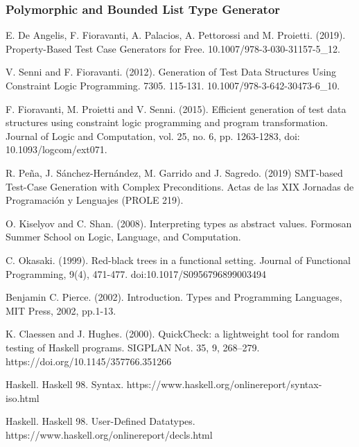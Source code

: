 \documentclass{report}
\theoremstyle{definition}
\theoremstyle{definition}
\begin{document}
	\subsubsection*{Polymorphic and Bounded List Type Generator}
	
	\begin{thebibliography}{9}
		E. De Angelis, F. Fioravanti, A. Palacios, A. Pettorossi and M. Proietti. (2019). Property-Based Test Case Generators for Free. 10.1007/978-3-030-31157-5\_12. 
														
		V. Senni and F. Fioravanti. (2012). Generation of Test Data Structures Using Constraint Logic Programming. 7305. 115-131. 10.1007/978-3-642-30473-6\_10.
														
		F. Fioravanti, M. Proietti and V. Senni. (2015). Efficient generation of test data structures using constraint logic programming and program transformation. Journal of Logic and Computation, vol. 25, no. 6, pp. 1263-1283, doi: 10.1093/logcom/ext071.
														
		R. Peña, J. Sánchez-Hernández, M. Garrido and J. Sagredo. (2019) SMT-based Test-Case Generation with Complex Preconditions. Actas de las XIX Jornadas de Programación y Lenguajes (PROLE 219).
														
		O. Kiselyov and C. Shan. (2008). Interpreting types as abstract values. Formosan Summer School on Logic, Language, and Computation.
														
		C. Okasaki. (1999). Red-black trees in a functional setting. Journal of Functional Programming, 9(4), 471-477. doi:10.1017/S0956796899003494
														
		Benjamin C. Pierce. (2002). Introduction. Types and Programming Languages, MIT Press, 2002, pp.1-13.
														
		K. Claessen and J. Hughes. (2000). QuickCheck: a lightweight tool for random testing of Haskell programs. SIGPLAN Not. 35, 9, 268–279. https://doi.org/10.1145/357766.351266
														
		Haskell. Haskell 98. Syntax. https://www.haskell.org/onlinereport/syntax-iso.html
														
		Haskell. Haskell 98. User-Defined Datatypes. https://www.haskell.org/onlinereport/decls.html
														
														
	\end{thebibliography}
				
\end{document}
